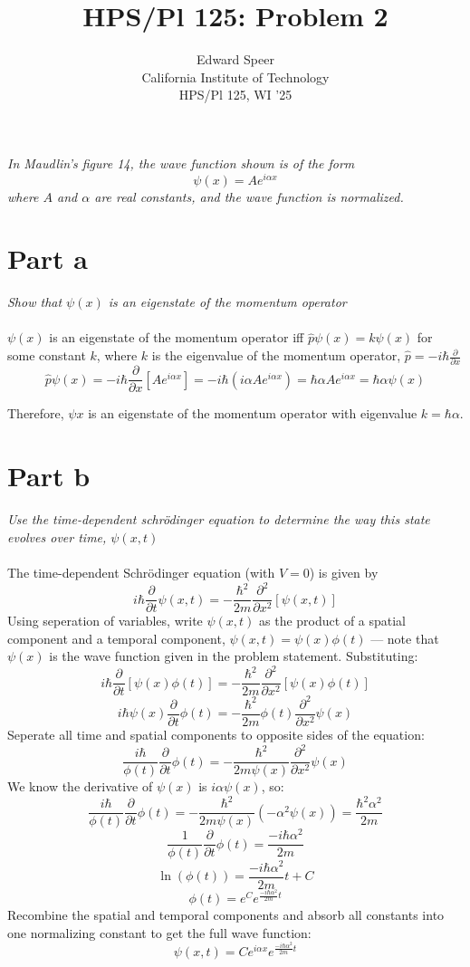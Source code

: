 \documentclass[11pt, a4paper]{article}
\title{HPS/Pl 125: Problem 2}
\author{%
  Edward Speer
  \\
  California Institute of Technology\\
  HPS/Pl 125, WI '25 \\
}
\date{\monthyeardate}
\begin{document}
\maketitle

\noindent \emph{In Maudlin's figure 14, the wave function shown is of the form
                \[\psi(x)=Ae^{i\alpha x}\]
                where $A$ and $\alpha$ are real constants, and the wave function
                is normalized.}

\section{Part a} \emph{Show that $\psi(x)$ is an eigenstate of the momentum
                       operator}
\\ \hfill \\
$\psi(x)$ is an eigenstate of the momentum operator iff
$\hat{p}\psi(x)=k\psi(x)$ for some constant $k$, where $k$ is the eigenvalue of
the momentum operator, $\hat{p} = -i\hbar\frac{\partial}{\partial x}$
\[\hat{p}\psi(x) = -i\hbar\frac{\partial}{\partial x}[Ae^{i\alpha x}]
  = -i\hbar(i\alpha Ae^{i\alpha x}) = \hbar\alpha Ae^{i\alpha x} =
  \hbar\alpha\psi(x)\]

\noindent Therefore, $\psi{x}$ is an eigenstate of the momentum operator with
eigenvalue $k=\hbar\alpha$.

\section{Part b} \emph{Use the time-dependent schrödinger equation to determine
                       the way this state evolves over time, $\psi(x, t)$}
\\ \hfill \\
The time-dependent Schrödinger equation (with $V = 0$) is given by
\[i\hbar\frac{\partial}{\partial t}\psi(x, t) =
-\frac{\hbar^2}{2m}\frac{\partial^2}{\partial x^2}[\psi(x, t)]\]
Using seperation of variables, write $\psi(x, t)$ as the product of a spatial
component and a temporal component, $\psi(x, t) = \psi(x)\phi(t)$ — note that 
$\psi(x)$ is the wave function given in the problem statement. Substituting:
\[i\hbar\frac{\partial}{\partial t}[\psi(x)\phi(t)] =
-\frac{\hbar^2}{2m}\frac{\partial^2}{\partial x^2}[\psi(x)\phi(t)]\]
\[i\hbar\psi(x)\frac{\partial}{\partial t}\phi(t) =
-\frac{\hbar^2}{2m}\phi(t)\frac{\partial^2}{\partial x^2}\psi(x)\]
Seperate all time and spatial components to opposite sides of the equation:
\[\frac{i\hbar}{\phi(t)}\frac{\partial}{\partial t}\phi(t) =
-\frac{\hbar^2}{2m\psi(x)}\frac{\partial^2}{\partial x^2}\psi(x)\]
We know the derivative of $\psi(x)$ is $i\alpha\psi(x)$, so:
\[\frac{i\hbar}{\phi(t)}\frac{\partial}{\partial t}\phi(t) =
-\frac{\hbar^2}{2m\psi(x)}(-\alpha^2\psi(x)) = 
\frac{\hbar^2\alpha^2}{2m}\]
\[\frac{1}{\phi(t)}\frac{\partial}{\partial t}\phi(t) =
\frac{-i\hbar\alpha^2}{2m}\]
\[\ln(\phi(t)) = \frac{-i\hbar\alpha^2}{2m}t + C\]
\[\phi(t)=e^C e^{\frac{-i\hbar\alpha^2}{2m}t}\]
Recombine the spatial and temporal components and absorb all constants
into one normalizing constant to get the full wave function:
\[\psi(x, t) = Ce^{i\alpha x}e^{\frac{-i\hbar\alpha^2}{2m}t}\]
\end{document}
